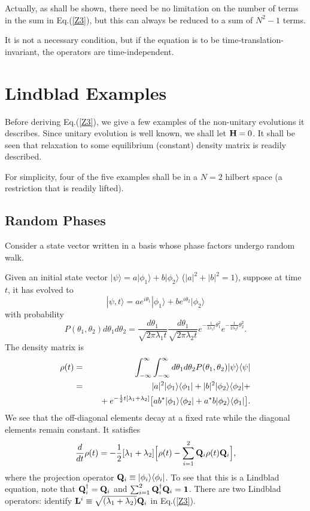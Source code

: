 \documentclass[aps,pra,amssymb, amsfonts,amsmath,showpacs, superscriptaddress,12pt]{revtex4}
\begin{document}
Actually, as shall be shown, there need be no limitation on the number of terms in the sum in Eq.(\ref{Z3}),  but this can always be reduced to a sum of 
$N^{2}-1$ terms.  

 It is not a necessary condition, but if the equation is to be time-translation-invariant, the operators are time-independent. 

\section{Lindblad Examples}

Before deriving Eq.(\ref{Z3}), we give a few examples of the non-unitary evolutions  it describes.   Since unitary evolution is well known, we shall let ${\bf H}=0$.  It shall be seen that relaxation to some equilibrium (constant) density matrix is readily described. 

For simplicity, four of the five examples shall be in a $N=2$ hilbert space (a restriction that is readily lifted).  

\subsection{Random Phases}
Consider a state vector written in a basis whose phase factors undergo random walk. 

Given an initial state vector $|\psi\rangle=a|\phi_{1}\rangle+b|\phi_{2}\rangle$ ($|a|^{2}+|b|^{2}=1$), suppose at time $t$, it has evolved to  
\[
|\psi,t\rangle=ae^{i\theta_{1}}|\phi_{1}\rangle+be^{i\theta_{2}}|\phi_{2}\rangle
\]
\noindent    with probability 
\[
P(\theta_{1}, \theta_{2})d\theta_{1}d \theta_{2}=\frac{d\theta_{1}}{\sqrt{2\pi\lambda_{1}t}}\frac{d\theta_{1}}{\sqrt{2\pi\lambda_{2}t}}e^{-\frac{1}{2\lambda_{1}t}\theta_{1}^{2}}e^{-\frac{1}{2\lambda_{2}t}\theta_{2}^{2}}. 
\] 
The density matrix is
\begin{eqnarray}
{\bf \rho}(t)&=&\int_{-\infty}^{\infty} \int_{-\infty}^{\infty}d\theta_{1}d\theta_{2}P(\theta_{1}, \theta_{2})
|\psi\rangle\langle\psi|\nonumber\\
&=&|a|^{2}|\phi_{1}\rangle\langle\phi_{1}|+|b|^{2}|\phi_{2}\rangle\langle\phi_{2}| + \nonumber\\
&&\quad {}+ e^{-\frac{1}{2}t[\lambda_{1}+\lambda_{2}]}\big[ab^{*}|\phi_{1}\rangle\langle\phi_{2}|+a^{*}b|\phi_{2}\rangle\langle\phi_{1}|\big]. \nonumber
\end{eqnarray}
\noindent  We see that the off-diagonal elements decay at a fixed rate while the diagonal elements remain constant.  It satisfies 
\[
\frac{d}{dt}{\bf \rho}(t)=-\frac{1}{2}[\lambda_{1}+\lambda_{2}]\Big[{\bf \rho}(t)-\sum_{i=1}^{2}{\bf Q}_{i}{\bf \rho}(t){\bf Q}_{i}\Big],
\]
\noindent where the projection operator ${\bf Q}_{i}\equiv|\phi_{i}\rangle\langle\phi_{i}|$.  To see that this is a Lindblad equation, note that  
${\bf Q}_{i}^{\dagger}={\bf Q}_{i}$ and $\sum_{i=1}^{2} {\bf Q}_{i}^{\dagger}{\bf Q}_{i}={\bf 1}$. There are two Lindblad operators:  identify ${\bf L}^{i}\equiv\sqrt{(\lambda_{1}+\lambda_{2})}{\bf Q}_{i}$ 
in Eq.(\ref{Z3}).
\end{document}
